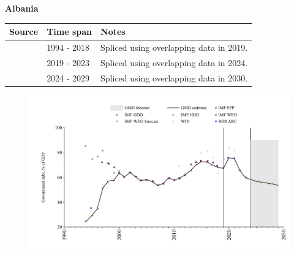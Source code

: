 \documentclass[12pt,a4paper,landscape]{article}
\begin{document}
\begin{adjustbox}{max totalsize={\paperwidth}{\paperheight},center}
\begin{minipage}[t][\textheight][t]{\textwidth}
\vspace*{0.5cm}
{}
\begin{center}
{\Large\bfseries Albania}
\end{center}
\vspace{0.5cm}
\begin{table}[H]
\centering
\small
\begin{tabular}{|l|l|l|}
\hline
\textbf{Source} & \textbf{Time span} & \textbf{Notes} \\
\hline
\rowcolor{white}\cite{IMF_GDD}& 1994 - 2018 &Spliced using overlapping data in 2019.\\
\rowcolor{lightgray}\cite{IMF_FPP}& 2019 - 2023 &Spliced using overlapping data in 2024.\\
\rowcolor{white}\cite{IMF_WEO_forecast}& 2024 - 2029 &Spliced using overlapping data in 2030.\\
\hline
\end{tabular}
\end{table}
\begin{figure}[H]
\centering
\includegraphics[width=\textwidth,height=0.6\textheight,keepaspectratio]{graphs/ALB_govdebt_GDP.pdf}
\end{figure}
\end{minipage}
\end{adjustbox}
\end{document}
